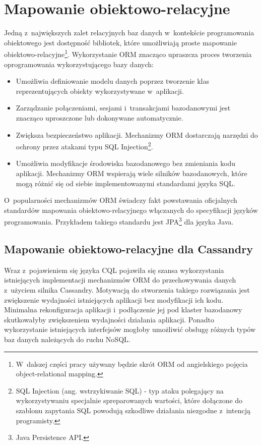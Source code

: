 
\chapter{Mapowanie obiektowo-relacyjne}

Jedną z~największych zalet relacyjnych baz danych w~kontekście programowania obiektowego jest dostępność bibliotek, które umożliwiają proste mapowanie obiektowo-relacyjne\footnote{W~dalszej części pracy używany będzie skrót ORM od angielskiego pojęcia object-relational mapping.}. Wykorzystanie ORM znacząco upraszcza proces tworzenia oprogramowania wykorzystującego bazy danych:

\begin{itemize}
	\item Umożliwia definiowanie modelu danych poprzez tworzenie klas reprezentujących obiekty wykorzystywane w~aplikacji.
	\item Zarządzanie połączeniami, sesjami i~transakcjami bazodanowymi jest znacząco uproszczone lub dokonywane automatycznie.
	\item Zwiększa bezpieczeństwo aplikacji. Mechanizmy ORM dostarczają narzędzi do ochrony przez atakami typu SQL Injection\footnote{SQL Injection (ang. wstrzykiwanie SQL) - typ ataku polegający na wykorzystywaniu specjalnie spreparowanych wartości, które dołączone do szablonu zapytania SQL powodują szkodliwe działania niezgodne z~intencją programisty.}.~\cite{orm_sql_injection_protection}
	\item Umożliwia modyfikacje środowiska bazodanowego bez zmieniania kodu aplikacji. Mechanizmy ORM wspierają wiele silników bazodanowych, które mogą różnić się od siebie implementowanymi standardami języka SQL. 
\end{itemize}

O~popularności mechanizmów ORM świadczy fakt powstawania oficjalnych standardów mapowania obiektowo-relacyjnego włączanych do specyfikacji języków programowania. Przykładem takiego standardu jest JPA\footnote{Java Persistence API.} dla języka Java.

\section{Mapowanie obiektowo-relacyjne dla Cassandry}

Wraz z~pojawieniem się języka CQL pojawiła się szansa wykorzystania istniejących implementacji mechanizmów ORM do przechowywania danych z~użyciem silnika Cassandry. Motywacją do stworzenia takiego rozwiązania jest zwiększenie wydajności istniejących aplikacji bez modyfikacji ich kodu. Minimalna rekonfiguracja aplikacji i~podłączenie jej pod klaster bazodanowy skutkowałyby zwiększeniem wydajności działania aplikacji. Ponadto wykorzystanie istniejących interfejsów mogłoby umożliwić obsługę różnych typów baz danych należących do ruchu NoSQL. 

